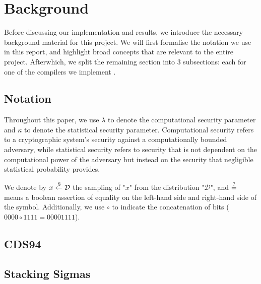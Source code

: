 \section{Background}
\label{sec:background}
Before discussing our implementation and results, we introduce the necessary background material for this project. 
We will first formalise the notation we use in this report, and highlight broad concepts that are relevant to the entire project. 
Afterwhich, we split the remaining section into 3 subsections: each for one of the compilers we implement \cite{CDS94, StackingSigmas, SpeedStacking}.

\subsection{Notation}
Throughout this paper, we use $\lambda$ to denote the computational security parameter and $\kappa$ to denote the statistical security parameter. Computational security refers to a cryptographic system's security against a computationally bounded adversary, while statistical security refers to security that is not dependent on the computational power of the adversary but instead on the security that negligible statistical probability provides.

We denote by $x \xleftarrow{\$} \mathcal D$ the sampling of "$x$" from the distribution "$\mathcal D$", and $\overset {?} {=}$ means a boolean assertion of equality on the left-hand side and right-hand side of the symbol. Additionally, we use $\circ$ to indicate the concatenation of bits ($0000 \circ 1111 = 00001111$).







\subsection{CDS94}




\subsection{Stacking Sigmas}







